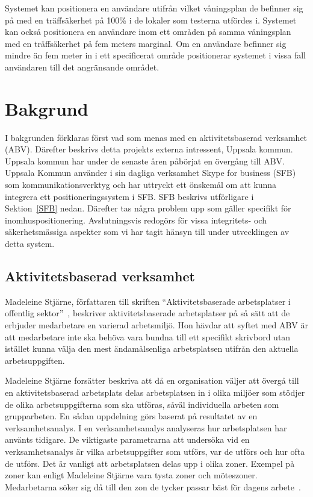 \documentclass[a4paper,12pt]{article}
\begin{document}
 Systemet kan positionera en användare utifrån vilket våningsplan de befinner sig på med en träffsäkerhet på 100\% i de lokaler som testerna utfördes i. Systemet kan också positionera en användare inom ett områden på samma våningsplan med en träffsäkerhet på fem meters marginal. Om en användare befinner sig mindre än fem meter in i ett specificerat område positionerar systemet i vissa fall användaren till det angränsande området.


 \section{Bakgrund}
 I bakgrunden förklaras först vad som menas med en aktivitetsbaserad verksamhet (ABV). Därefter beskrivs detta projekts externa intressent, Uppsala kommun. Uppsala kommun har under de senaste åren påbörjat en övergång till ABV. Uppsala Kommun använder i sin dagliga verksamhet Skype for business (SFB) som kommunikationsverktyg och har uttryckt ett önskemål om att kunna integrera ett positioneringssystem i SFB. SFB beskrivs utförligare i Sektion~\ref{SFB} nedan. Därefter tas några problem upp som gäller specifikt för inomhuspositionering. Avslutningsvis redogörs för vissa integritets- och säkerhetsmässiga aspekter som vi har tagit hänsyn till under utvecklingen av detta system.


 \subsection{Aktivitetsbaserad verksamhet}
 Madeleine Stjärne, författaren till skriften ``Aktivitetsbaserade
 arbetsplatser i offentlig sektor''~\cite{ABV}, beskriver aktivitetsbaserade arbetsplatser på så sätt att de erbjuder medarbetare en varierad arbetsmiljö. Hon hävdar att syftet med ABV är att medarbetare inte ska behöva vara bundna till ett specifikt skrivbord utan istället kunna välja den mest ändamålsenliga arbetsplatsen utifrån den aktuella arbetsuppgiften. %

 Madeleine Stjärne forsätter beskriva att då en organisation väljer att övergå till en aktivitetsbaserad arbetsplats delas arbetsplatsen in i olika miljöer som stödjer de olika arbetsuppgifterna som ska utföras, såväl individuella arbeten som grupparbeten. En sådan uppdelning görs baserat på resultatet av en verksamhetsanalys. I en verksamhetsanalys analyseras hur arbetsplatsen har använts tidigare. De viktigaste parametrarna att undersöka vid en verksamhetsanalys är vilka arbetsuppgifter som utförs, var de utförs och hur ofta de utförs. Det är vanligt att arbetsplatsen delas upp i olika zoner. Exempel på zoner kan enligt Madeleine Stjärne vara tysta zoner och möteszoner. Medarbetarna söker sig då till den zon de tycker passar bäst för dagens arbete~\cite{ABV}.
\end{document}
